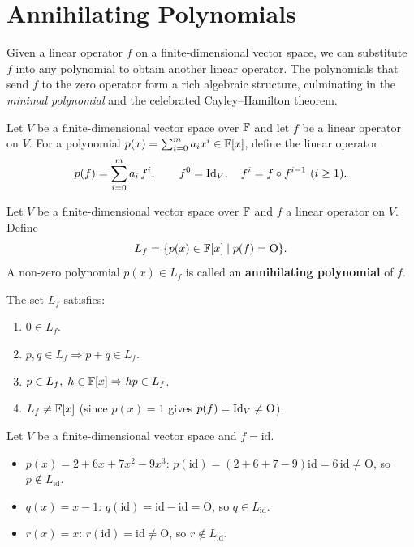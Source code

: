 \section{Annihilating Polynomials}
\label{sec:annihilating}

Given a linear operator $f$ on a finite-dimensional vector space, we can
substitute $f$ into any polynomial to obtain another linear operator.  The
polynomials that send $f$ to the zero operator form a rich algebraic
structure, culminating in the \emph{minimal polynomial} and the celebrated
Cayley--Hamilton theorem.

\begin{defbox}
\label{def:poly-of-op}
Let $V$ be a finite-dimensional vector space over $\mathbb{F}$ and let $f$ be a
linear operator on $V$.  For a polynomial
$p(x)=\sum_{i=0}^{m}a_i x^i\in\mathbb{F}[x]$, define the linear operator
\[
    p(f) = \sum_{i=0}^{m} a_i\,f^i,
    \qquad f^0=\mathrm{Id}_V,\quad f^i = f\circ f^{i-1}\ (i\ge 1).
\]
\end{defbox}

\begin{defbox}
\label{def:annihilating}
Let $V$ be a finite-dimensional vector space over $\mathbb{F}$ and $f$ a linear
operator on $V$.  Define
\[
    L_f = \{p(x)\in\mathbb{F}[x]\mid p(f)=\mathrm{O}\}.
\]
A non-zero polynomial $p(x)\in L_f$ is called an
\textbf{annihilating polynomial} of $f$.

\medskip\noindent
The set $L_f$ satisfies:
\begin{enumerate}[label=\textbf{(\roman*)}]
    \item $0\in L_f$.
    \item $p,q\in L_f\Rightarrow p+q\in L_f$.
    \item $p\in L_f,\;h\in\mathbb{F}[x]\Rightarrow hp\in L_f$.
    \item $L_f\neq\mathbb{F}[x]$ (since $p(x)=1$ gives $p(f)=\mathrm{Id}_V\neq\mathrm{O}$).
\end{enumerate}
\end{defbox}

\begin{exbox}
\label{ex:annihilating-id}
Let $V$ be a finite-dimensional vector space and $f=\mathrm{id}$.
\begin{itemize}
    \item $p(x)=2+6x+7x^2-9x^3$:
          $p(\mathrm{id})=(2+6+7-9)\mathrm{id}=6\,\mathrm{id}\neq\mathrm{O}$,
          so $p\notin L_{\mathrm{id}}$.
    \item $q(x)=x-1$:
          $q(\mathrm{id})=\mathrm{id}-\mathrm{id}=\mathrm{O}$,
          so $q\in L_{\mathrm{id}}$.
    \item $r(x)=x$:
          $r(\mathrm{id})=\mathrm{id}\neq\mathrm{O}$,
          so $r\notin L_{\mathrm{id}}$.
\end{itemize}
\end{exbox}

